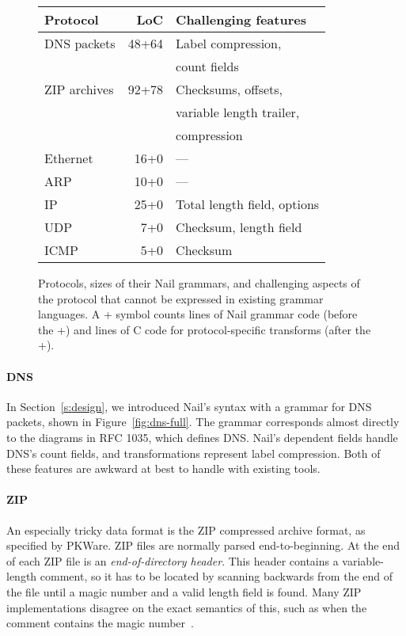 \begin{figure}[tb]
\centering
\begin{tabular}{lrl}
\toprule
\textbf{Protocol} & \textbf{LoC} & \textbf{Challenging features} \\ 
\midrule
DNS packets & 48+64 & Label compression,\\
  & & count fields \\
ZIP archives & 92+78 & Checksums, offsets, \\ 
  & & variable length trailer, \\
  & & compression \\
Ethernet  & 16+0\phantom{0} & --- \\
ARP       & 10+0\phantom{0} & --- \\
IP        & 25+0\phantom{0} & Total length field, options \\
UDP       &  7+0\phantom{0} & Checksum, length field \\
ICMP      &  5+0\phantom{0} & Checksum \\
\bottomrule
\end{tabular}

\caption{Protocols, sizes of their Nail grammars, and challenging aspects
of the protocol that cannot be expressed in existing grammar languages.
A + symbol counts lines of Nail grammar code (before the +) and lines of
C code for protocol-specific transforms (after the +).}
\label{fig:eval-protocols}
\end{figure}

\paragraph{DNS} In Section~\ref{s:design}, we introduced Nail's syntax with a grammar
for DNS packets, shown in Figure~\ref{fig:dns-full}.
The grammar corresponds almost directly to the diagrams in RFC 1035,
which defines DNS. Nail's dependent fields handle DNS's count fields, and
transformations represent label compression. Both of these features are awkward at best to handle
with existing tools.


\paragraph{ZIP} An especially tricky data format is the ZIP compressed archive format, as specified
by PKWare.
ZIP files are normally parsed end-to-beginning. At the end of each ZIP file is an
\emph{end-of-directory header}. This header contains a variable-length comment, so it has to be
located by scanning backwards from the end of the file until a magic number and a valid length field
is found. Many ZIP implementations disagree on the exact semantics of this, such as when the comment
contains the magic number~\cite{wolf:berlinsides-zip}.

